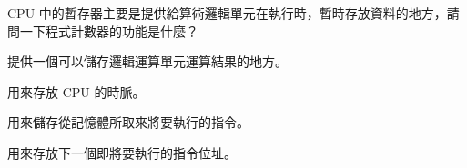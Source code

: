 \ifx\ntpcNinetyTwo\undefined[92學年基北區] \fi
CPU 中的暫存器主要是提供給算術邏輯單元在執行時，暫時存放資料的地方，請問一下程式計數器的功能是什麼？
  \begin{optionlist}
  \item 提供一個可以儲存邏輯運算單元運算結果的地方。
  \item 用來存放 CPU 的時脈。
  \item 用來儲存從記憶體所取來將要執行的指令。
  \item 用來存放下一個即將要執行的指令位址。\label{ntpc-92-a32}
  \end{optionlist}
